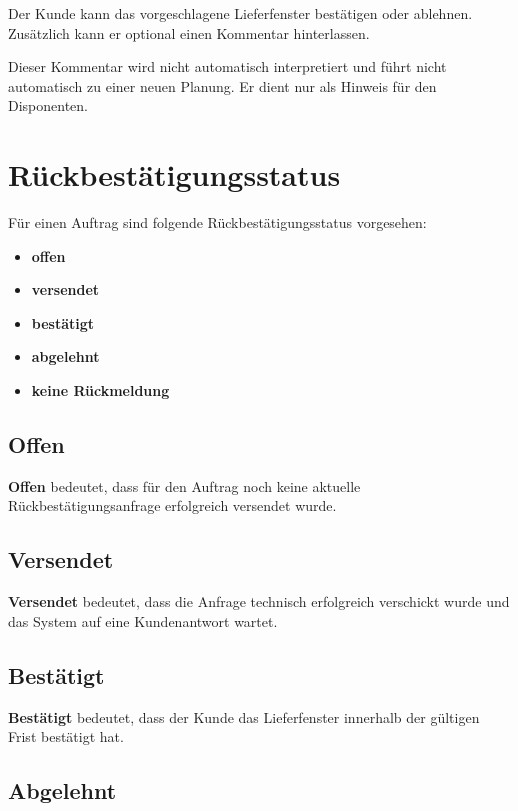 \documentclass[12pt,a4paper]{article}
\begin{document}
	Der Kunde kann das vorgeschlagene Lieferfenster bestätigen oder ablehnen. Zusätzlich kann er optional einen Kommentar hinterlassen.
	
	Dieser Kommentar wird nicht automatisch interpretiert und führt nicht automatisch zu einer neuen Planung. Er dient nur als Hinweis für den Disponenten.
	
	\section{Rückbestätigungsstatus}
	
	Für einen Auftrag sind folgende Rückbestätigungsstatus vorgesehen:
	
	\begin{itemize}
		\item \textbf{offen}
		\item \textbf{versendet}
		\item \textbf{bestätigt}
		\item \textbf{abgelehnt}
		\item \textbf{keine Rückmeldung}
	\end{itemize}
	
	\subsection{Offen}
	
	\textbf{Offen} bedeutet, dass für den Auftrag noch keine aktuelle Rückbestätigungsanfrage erfolgreich versendet wurde.
	
	\subsection{Versendet}
	
	\textbf{Versendet} bedeutet, dass die Anfrage technisch erfolgreich verschickt wurde und das System auf eine Kundenantwort wartet.
	
	\subsection{Bestätigt}
	
	\textbf{Bestätigt} bedeutet, dass der Kunde das Lieferfenster innerhalb der gültigen Frist bestätigt hat.
	
	\subsection{Abgelehnt}
	
\end{document}
